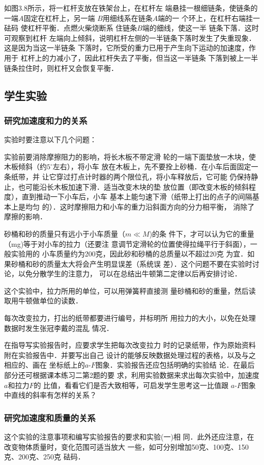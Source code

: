 如图3.8所示，将一杠杆支放在铁架台上，在杠杆左
端悬挂一根细链条，使链条的
一端$A$固定在杠杆上，另一端
$B$用细线系在链条$A$端的一
个环上，在杠杆右端挂一砝码
使杠杆平衡．点燃火柴烧断系
住链条$B$端的细线，使这一半
链条下落．这时可观察到杠杆
左端向上倾斜，说明杠杆左侧的一半链条下落时发生了失重现象．这是因为当这一半链条
下落时，它所受的重力已用于产生向下运动的加速度，作用于
杠杆上的力减小了，因此杠杆失去了平衡，但当这一半链条
下落到被上一半链条拉住时，则杠杆又会恢复平衡．

\subsection{学生实验}
\subsubsection{研究加速度和力的关系}
实验时要注意以下几个问题：

实验前要消除摩擦阻力的影响，将长木板不带定滑
轮的一端下面垫放一木块，使木板倾斜（约$5^{\circ}$左右），将小车
放在木板上，先不要拴上砂桶．在小车后面固定一条纸带，并
让它穿过打点计时器的两个限位孔，将小车释放后，它可能
仍保持静止，也可能沿长木板加速下滑．适当改变木块的垫
放位置（即改变木板的倾斜程度），直到推动一下小车后，小车
基本上能匀速下滑（纸带上打出的点子的间隔基本上是均匀
的）．这时摩擦阻力和小车的重力沿斜面方向的分力相平衡，
消除了摩擦的影响．

砂桶和砂的质量只有远小于小车质量（$m\ll M$)的条
件下，才可以认为它的重量（mg)等于对小车的拉力（还要注
意调节定滑轮的位置使得拉绳平行于斜面），一般实验用的
小车质量约为200克，因此砂和砂桶的总质量以不超过20克
为宜．如果砂桶和砂的质量太大将会产生明显误差（系统误
差）．这个问题不要在实验时讨论，以免分散学生的注意力，
可以在总结出牛顿第二定律以后再安排讨论．

这个实验中，拉力所用的单位，可以用弹簧秤直接测
量砂桶和砂的重量，然后读取用牛顿做单位的读数．

每次改变拉力，打出的纸带都要进行编号，并标明所
用拉力的大小，以免在处理数据时发生张冠李戴的混乱
情况．

在指导写实验报告时，应要求学生把每次改变拉力
时的记录纸带，作为原始资料附在实验报告中．并要写出自己
设计的能够反映数据处理过程的表格，以及与之相应的、画在
坐标纸上的$a$-$F$图象．实验报告还应包括明确的实验结
论．在最后部分还可根据课本练习二第2题的要
求，利用实验数据来求出每次实验中，加速度$a$和拉力$F$的
比值，看看它们是否大致相等，可启发学生思考这一比值跟
$a$-$F$图象中直线的斜率有怎样的关系？

\subsubsection{研究加速度和质量的关系}
这个实验的注意事项和编写实验报告的要求和实验(一)相
同．此外还应注意，在改变物体质量时，变化范围可适当放大
一些，如可分别增加50克、100克、150克、200克、250克
砝码．

